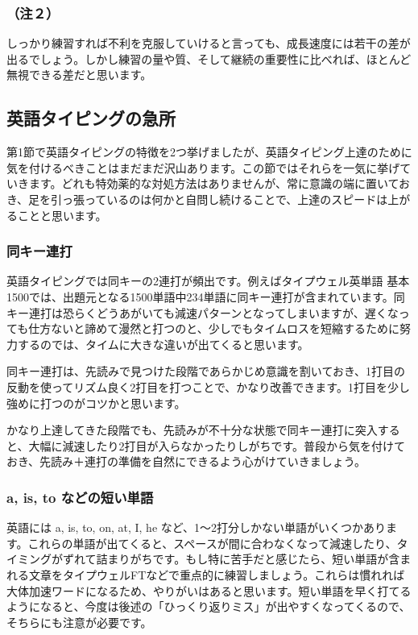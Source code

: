 \subsubsection*{（注２）}
しっかり練習すれば不利を克服していけると言っても、成長速度には若干の差が出るでしょう。しかし練習の量や質、そして継続の重要性に比べれば、ほとんど無視できる差だと思います。

\subsection{英語タイピングの急所}

第1節で英語タイピングの特徴を2つ挙げましたが、英語タイピング上達のために気を付けるべきことはまだまだ沢山あります。この節ではそれらを一気に挙げていきます。どれも特効薬的な対処方法はありませんが、常に意識の端に置いておき、足を引っ張っているのは何かと自問し続けることで、上達のスピードは上がることと思います。

\subsubsection*{同キー連打}

英語タイピングでは同キーの2連打が頻出です。例えばタイプウェル英単語 基本1500では、出題元となる1500単語中234単語に同キー連打が含まれています。同キー連打は恐らくどうあがいても減速パターンとなってしまいますが、遅くなっても仕方ないと諦めて漫然と打つのと、少しでもタイムロスを短縮するために努力するのでは、タイムに大きな違いが出てくると思います。

同キー連打は、先読みで見つけた段階であらかじめ意識を割いておき、1打目の反動を使ってリズム良く2打目を打つことで、かなり改善できます。1打目を少し強めに打つのがコツかと思います。

かなり上達してきた段階でも、先読みが不十分な状態で同キー連打に突入すると、大幅に減速したり2打目が入らなかったりしがちです。普段から気を付けておき、先読み＋連打の準備を自然にできるよう心がけていきましょう。

\subsubsection*{a, is, to などの短い単語}

英語には a, is, to, on, at, I, he など、1～2打分しかない単語がいくつかあります。これらの単語が出てくると、スペースが間に合わなくなって減速したり、タイミングがずれて詰まりがちです。もし特に苦手だと感じたら、短い単語が含まれる文章をタイプウェルFTなどで重点的に練習しましょう。これらは慣れれば大体加速ワードになるため、やりがいはあると思います。短い単語を早く打てるようになると、今度は後述の「ひっくり返りミス」が出やすくなってくるので、そちらにも注意が必要です。

